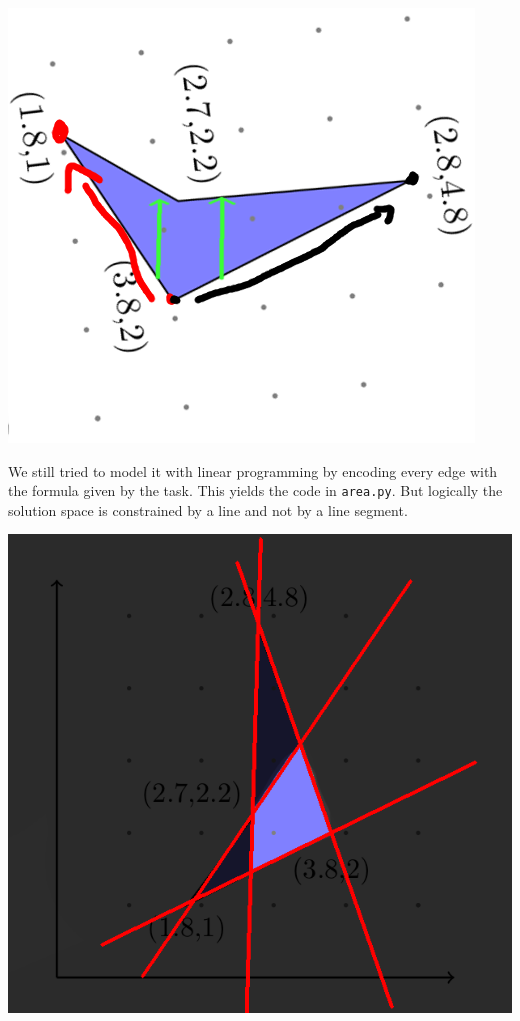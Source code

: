 \documentclass{base}
\begin{document}
\includegraphics[scale=0.5]{rotated.png}

We still tried to model it with linear programming by encoding every edge with the formula given by the task.
This yields the code in \verb|area.py|.
But logically the solution space is constrained by a line and not by a line segment.

\includegraphics[scale=0.5]{solution_space.png}
\end{document}
